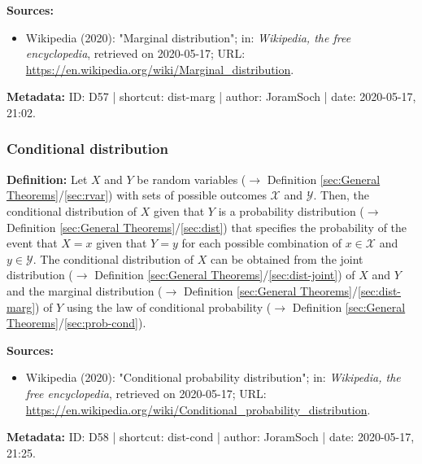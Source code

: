 \documentclass[a4paper,12pt,twoside]{book}
\begin{document}
\vspace{1em}
\textbf{Sources:}
\begin{itemize}
\item Wikipedia (2020): "Marginal distribution"; in: \textit{Wikipedia, the free encyclopedia}, retrieved on 2020-05-17; URL: \url{https://en.wikipedia.org/wiki/Marginal_distribution}.
\end{itemize}


\vspace{1em}
\textbf{Metadata:} ID: D57 | shortcut: dist-marg | author: JoramSoch | date: 2020-05-17, 21:02.
\vspace{1em}



\subsubsection[\textit{Conditional distribution}]{Conditional distribution} \label{sec:dist-cond}
\setcounter{equation}{0}

\textbf{Definition:} Let $X$ and $Y$ be random variables ($\rightarrow$ Definition \ref{sec:General Theorems}/\ref{sec:rvar}) with sets of possible outcomes $\mathcal{X}$ and $\mathcal{Y}$. Then, the conditional distribution of $X$ given that $Y$ is a probability distribution ($\rightarrow$ Definition \ref{sec:General Theorems}/\ref{sec:dist}) that specifies the probability of the event that $X = x$ given that $Y = y$ for each possible combination of $x \in \mathcal{X}$ and $y \in \mathcal{Y}$. The conditional distribution of $X$ can be obtained from the joint distribution ($\rightarrow$ Definition \ref{sec:General Theorems}/\ref{sec:dist-joint}) of $X$ and $Y$ and the marginal distribution ($\rightarrow$ Definition \ref{sec:General Theorems}/\ref{sec:dist-marg}) of $Y$ using the law of conditional probability ($\rightarrow$ Definition \ref{sec:General Theorems}/\ref{sec:prob-cond}).


\vspace{1em}
\textbf{Sources:}
\begin{itemize}
\item Wikipedia (2020): "Conditional probability distribution"; in: \textit{Wikipedia, the free encyclopedia}, retrieved on 2020-05-17; URL: \url{https://en.wikipedia.org/wiki/Conditional_probability_distribution}.
\end{itemize}


\vspace{1em}
\textbf{Metadata:} ID: D58 | shortcut: dist-cond | author: JoramSoch | date: 2020-05-17, 21:25.
\vspace{1em}
\end{document}
